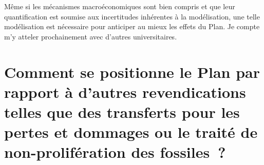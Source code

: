 \documentclass[a5paper,french,openany]{memoir}
\begin{document}
Même si les mécanismes macroéconomiques sont bien compris et que leur quantification est soumise aux incertitudes inhérentes à la modélisation, une telle modélisation est nécessaire pour anticiper au mieux les effets du Plan. Je compte m'y atteler prochainement avec d'autres universitaires.





\section*{\normalsize Comment se positionne le Plan par rapport à d'autres revendications telles que des transferts pour les pertes et dommages ou le traité de non-prolifération des fossiles~?}\label{q:climate_movt}
\end{document}
